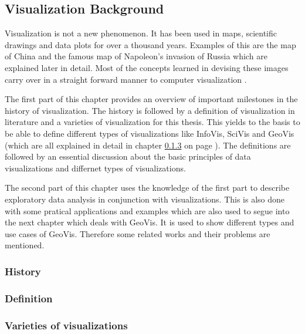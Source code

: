 \subsection{Visualization Background}
Visualization is not a new phenomenon. It has been used in maps, scientific drawings and data plots for over a thousand years. Examples of this are the map of China and the famous map of Napoleon's invasion of Russia which are explained later in detail. Most of the concepts learned in devising these images carry over in a straight forward manner to computer visualization .

The first part of this chapter provides an overview of important milestones in the history of visualization. The history is followed by a definition of visualization in literature and a varieties of visualization for this thesis. This yields to the basis to be able to define different types of visualizations like \ac{InfoVis}, \ac{SciVis} and \ac{GeoVis} (which are all explained in detail in chapter \ref{s:definitions-types} on page \pageref{s:definitions-types}). The definitions are followed by an essential discussion about the basic principles of data visualizations and differnet types of visualizations.

The second part of this chapter uses the knowledge of the first part to describe exploratory data analysis in conjunction with visualizations. This is also done with some pratical applications and examples which are also used to segue into the next chapter which deals with \ac{GeoVis}. It is used to show different types and use cases of \ac{GeoVis}. Therefore some related works and their problems are mentioned.

\subsubsection{History}
\label{s:history}


\subsubsection{Definition}
\label{s:definition}


\subsubsection{Varieties of visualizations}
\label{s:definitions-types}


